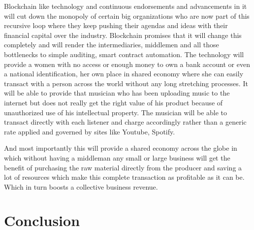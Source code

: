 Blockchain like technology and continuous endorsements and
advancements in it will cut down the monopoly of certain big
organizations who are now part of this recursive loop where they keep
pushing their agendas and ideas with their financial capital over the
industry. Blockchain promises that it will change this completely and
will render the intermediaries, middlemen and all those bottlenecks to
simple auditing, smart contract automation. The technology will
provide a women with no access or enough money to own a bank account
or even a national identification, her own place in shared economy
where she can easily transact with a person across the world without
any long stretching processes. It will be able to provide that
musician who has been uploading music to the internet but does not
really get the right value of his product because of unauthorized use
of his intellectual property. The musician will be able to transact
directly with each listener and charge accordingly rather than a
generic rate applied and governed by sites like Youtube, Spotify.

And most importantly this will provide a shared economy across the
globe in which without having a middleman any small or large business
will get the benefit of purchasing the raw material directly from the
producer and saving a lot of resources which make this complete
transaction as profitable as it can be. Which in turn boosts a
collective business revenue.


\section{Conclusion}

